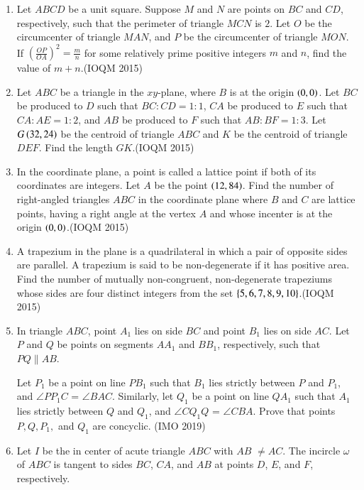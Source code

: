 \begin{enumerate}
    \item Let $ABCD$ be a unit square. Suppose $M$ and $N$ are points on $BC$ and $CD$, respectively, such that the perimeter of triangle $MCN$ is $2$. Let $O$ be the circumcenter of triangle $MAN$, and $P$ be the circumcenter of triangle $MON$. If $\left(\frac{OP}{OA}\right)^2 = \frac{m}{n}$ for some relatively prime positive integers $m$ and $n$, find the value of $m + n$.\hfill(IOQM 2015)
    
    \item Let $ABC$ be a triangle in the $xy$-plane, where $B$ is at the origin $\left(0, 0\right)$. Let $BC$ be produced to $D$ such that $BC : CD = 1 : 1$, $CA$ be produced to $E$ such that $CA : AE = 1 : 2$, and $AB$ be produced to $F$ such that $AB : BF = 1 : 3$. Let $G\left(32, 24\right)$ be the centroid of triangle $ABC$ and $K$ be the centroid of triangle $DEF$. Find the length $GK$.\hfill(IOQM 2015)
    
    \item In the coordinate plane, a point is called a lattice point if both of its coordinates are integers. Let $A$ be the point $\left(12, 84\right)$. Find the number of right-angled triangles $ABC$ in the coordinate plane where $B$ and $C$ are lattice points, having a right angle at the vertex $A$ and whose incenter is at the origin $\left(0, 0\right)$.\hfill(IOQM 2015)
    
    \item A trapezium in the plane is a quadrilateral in which a pair of opposite sides are parallel. A trapezium is said to be non-degenerate if it has positive area. Find the number of mutually non-congruent, non-degenerate trapeziums whose sides are four distinct integers from the set $\left\{5, 6, 7, 8, 9, 10\right\}$.\hfill(IOQM 2015)
    
    \item In triangle  $ABC$, point $ A_1 $ lies on side $ BC $ and point $B_1$ lies on side $ AC $. Let  $P$ and $ Q $ be points on segments 
$AA_1$ and $BB_1 $, respectively, such that   $PQ \parallel AB$.

Let
 $P_1$ be a point on line  $PB_1$ such that $B_1$ lies strictly between 
$P$ and $P_1$, and $\angle PP_1C$ = $\angle BAC$. Similarly, let $Q_1$ 
be a point on line $QA_1$ such that $A_1$ lies strictly between $Q$ and 
$Q_1$, and $ \angle CQ_1Q$ = $\angle CBA $.
Prove that points $P, Q, P_1,$ and $Q_1$ are concyclic.
\hfill(IMO 2019)


\item
 Let $I$ be the in center of acute triangle $ABC$ with $AB$ $\neq AC$. 
The incircle $\omega$ of $ABC$ is tangent to sides $ BC$, $CA$, and $AB$
 at points $D$,  $E$, and $F$, respectively. 



\end{enumerate}

